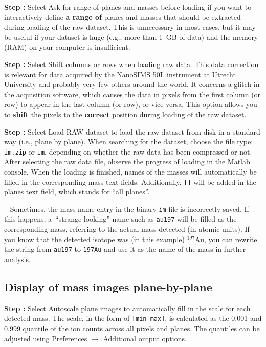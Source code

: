 \documentclass[a4paper, 11pt]{article}
\newcommand{\ttt}[1]{\texttt{#1}}
\newcommand{\lans}[1]{{\color{magenta}#1}}
\newcommand{\lanstf}[1]{{\color{cyan}#1}}
\newcommand\ra{\rightarrow}
\newcommand\addon[1]{-- {\small #1}}
\newcounter{step}
\newcommand\s{\addtocounter{step}{1}\noindent\textbf{Step \thestep:}{ }}
\newcommand\bb[1]{\textbf{#1}}
\begin{document}
\s Select \lans{Ask for range of planes and masses before loading} if you want to interactively define \bb{a range of} planes and masses that should be extracted during loading of the raw dataset. This is unnecessary in most cases, but it may be useful if your dataset is huge (e.g., more than 1~GB of data) and the memory (RAM) on your computer is insufficient.

\s Select \lans{Shift columns or rows when loading raw data}. This data correction is relevant for data acquired by the NanoSIMS 50L instrument at Utrecht University and probably very few others around the world. It concerns a glitch in the acquisition software, which causes the data in pixels from the first column (or row) to appear in the last column (or row), or vice versa. This option allows you to \bb{shift} the pixels to the \bb{correct} position during loading of the raw dataset.

\s Select \lans{Load RAW dataset} to load the raw dataset from disk in a standard way (i.e., plane by plane). When searching for the dataset, choose the file type: \ttt{im.zip} or \ttt{im}, depending on whether the raw data has been compressed or not. After selecting the raw data file, observe the progress of loading in the Matlab console. When the loading is finished, names of the masses will automatically be filled in the corresponding \lanstf{mass} text fields. Additionally, \ttt{[]} will be added in the \lanstf{planes} text field, which stands for ``all planes''.

\addon{Sometimes, the mass name entry in the binary \ttt{im} file is incorrectly saved. If this happens, a~``strange-looking'' name such as \ttt{au197} will be filled as the corresponding \lanstf{mass}, referring to the actual mass detected (in atomic units). If you know that the detected isotope was (in this example) ${}^{197}$Au, you can rewrite the string from \ttt{au197} to \ttt{197Au} and use it as the name of the mass in further analysis.}


\subsection{Display of mass images plane-by-plane}

\setcounter{step}{0}

\s Select \lans{Autoscale plane images} to automatically fill in the \lanstf{scale} for each detected mass. The scale, in the form of \ttt{[min max]}, is calculated as the 0.001 and 0.999 quantile of the ion counts across all pixels and planes. The quantiles can be adjusted using \lans{Preferences} $\ra$ \lans{Additional output options}. 
\end{document}
